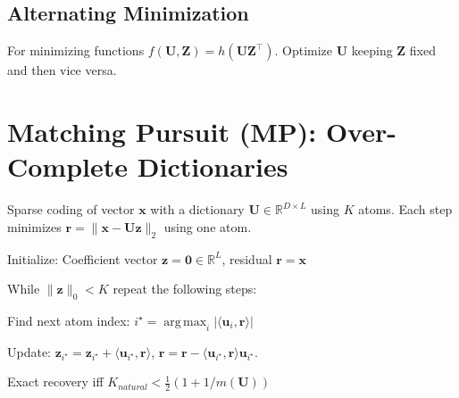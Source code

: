 \documentclass[a4paper, 11pt, landscape]{article}
\DeclareMathOperator*{\argmax}{arg\,max}
\begin{document}
\begin{multicols*}{3}
\subsection{Alternating Minimization}
For minimizing functions $f(\mathbf{U},\mathbf{Z}) = h(\mathbf{UZ}^\top)$. Optimize $\mathbf{U}$ keeping $\mathbf{Z}$ fixed and then vice versa.

\section{Matching Pursuit (MP): Over-Complete Dictionaries}
Sparse coding of vector $\mathbf{x}$ with a dictionary $\mathbf{U} \in \mathbb{R}^{D \times L}$ using $K$ atoms.
Each step minimizes $\mathbf{r} = \| \mathbf{x-Uz}\|_2$ using one atom.
\begin{compactenum}
	\item Initialize: Coefficient vector $\mathbf{z} = \mathbf{0} \in \mathbb{R}^{L}$, residual $\mathbf{r} = \mathbf{x}$
	\item While $\|\mathbf{z}\|_0 < K$ repeat the following steps:
	\item Find next atom index: $i^\star = \argmax_i |\langle \mathbf{u}_i, \mathbf{r} \rangle|$
	\item Update: $\mathbf{z}_{i^\star} = \mathbf{z}_{i^\star} + \langle \mathbf{u}_{i^\star}, \mathbf{r} \rangle$, 
	$\mathbf{r} = \mathbf{r} - \langle \mathbf{u}_{i^\star}, \mathbf{r} \rangle \mathbf{u}_{i^\star}$.
\end{compactenum}
Exact recovery iff $K_{natural} < \frac{1}{2} (1+1/m(\mathbf{U}))$


\end{multicols*}
\end{document}
